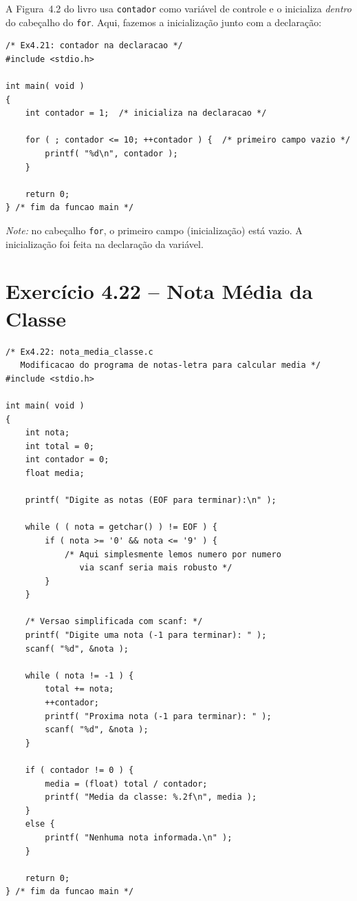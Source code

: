 \documentclass[12pt,a4paper]{article}
\begin{document}
\begin{respostabox}
A Figura~4.2 do livro usa \texttt{contador} como variável de controle e o inicializa
\textit{dentro} do cabeçalho do \texttt{for}. Aqui, fazemos a inicialização junto
com a declaração:

\begin{lstlisting}
/* Ex4.21: contador na declaracao */
#include <stdio.h>

int main( void )
{
    int contador = 1;  /* inicializa na declaracao */

    for ( ; contador <= 10; ++contador ) {  /* primeiro campo vazio */
        printf( "%d\n", contador );
    }

    return 0;
} /* fim da funcao main */
\end{lstlisting}

\textit{Note:} no cabeçalho \texttt{for}, o primeiro campo (inicialização) está vazio.
A inicialização foi feita na declaração da variável.
\end{respostabox}

\newpage

\section{Exercício 4.22 -- Nota Média da Classe}

\begin{respostabox}
\begin{lstlisting}
/* Ex4.22: nota_media_classe.c
   Modificacao do programa de notas-letra para calcular media */
#include <stdio.h>

int main( void )
{
    int nota;
    int total = 0;
    int contador = 0;
    float media;

    printf( "Digite as notas (EOF para terminar):\n" );

    while ( ( nota = getchar() ) != EOF ) {
        if ( nota >= '0' && nota <= '9' ) {
            /* Aqui simplesmente lemos numero por numero
               via scanf seria mais robusto */
        }
    }

    /* Versao simplificada com scanf: */
    printf( "Digite uma nota (-1 para terminar): " );
    scanf( "%d", &nota );

    while ( nota != -1 ) {
        total += nota;
        ++contador;
        printf( "Proxima nota (-1 para terminar): " );
        scanf( "%d", &nota );
    }

    if ( contador != 0 ) {
        media = (float) total / contador;
        printf( "Media da classe: %.2f\n", media );
    }
    else {
        printf( "Nenhuma nota informada.\n" );
    }

    return 0;
} /* fim da funcao main */
\end{lstlisting}
\end{respostabox}
\end{document}
